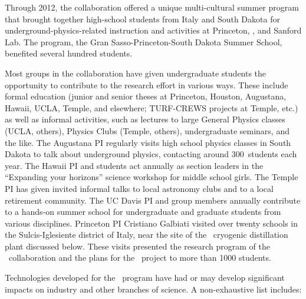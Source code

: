 Through 2012, the collaboration offered a unique multi-cultural summer program that brought together high-school students from Italy and South Dakota for underground-physics-related instruction and activities at Princeton, \LNGS, and Sanford Lab.  The program, the Gran Sasso-Princeton-South Dakota Summer School, benefited several hundred students.

Most groups in the collaboration have given undergraduate students the opportunity to contribute to the research effort in various ways.  These include formal education (junior and senior theses at Princeton, Houston, Augustana, Hawaii, UCLA, Temple, and elsewhere; TURF-CREWS projects at Temple, etc.) as well as informal activities, such as lectures to large General Physics classes (UCLA, others), Physics Clubs (Temple, others),  undergraduate seminars, and the like. The Augustana PI regularly visits high school physics classes in South Dakota to talk about underground physics, contacting around \num{300}~students each year.  The Hawaii PI and students act annually as section leaders in the ``Expanding your horizons'' science workshop for middle school girls.  The Temple PI has given invited informal talks to local astronomy clubs and to a local retirement community. The UC Davis PI and group members annually contribute to a hands-on summer school for undergraduate and graduate students from various disciplines. Princeton PI Cristiano Galbiati visited over twenty schools in the Sulcis-Iglesiente district of Italy, near the site of the \Aria\ cryogenic distillation plant discussed below.  These visits presented the research program of the \GADMC\ collaboration and the plans for the \Aria\ project to more than \num{1000} students.

Technologies developed for the \DSs\ program have had or may develop significant impacts on industry and other branches of science.  A non-exhaustive list includes:

